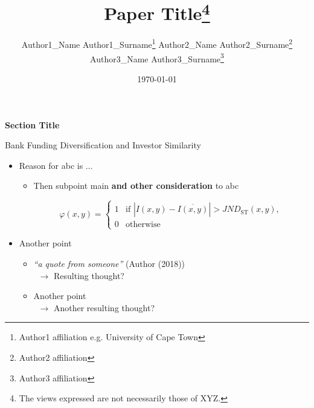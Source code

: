 \documentclass[xcolor=dvipsnames,10pt]{beamer}
\begin{document}
%

\author[Author1Surname/Author2Surname/Author3Surname]{Author1\_Name Author1\_Surname\thanks{Author1 affiliation e.g. University of Cape Town} \quad Author2\_Name Author2\_Surname\thanks{Author2 affiliation} \quad Author3\_Name Author3\_Surname\thanks{Author3 affiliation}}
\title[Paper Title]{Paper Title\footnote{The views expressed are not necessarily those of XYZ.}}
\date[Name of Conference, \today]{\today}

\begin{frame}
	\titlepage
\end{frame}

\begin{frame}
	\thispagestyle{empty}
	\begin{center}
		{\bf {\Large Section Title}}
	\end{center}
\end{frame}

\begin{frame}{Bank Funding Diversification and Investor Similarity}
	\setcounter{framenumber}{2}

	
	\begin{itemize}\itemsep15pt
		\item Reason for abc is $\ldots$
		\begin{itemize}\itemsep7pt
			\item Then subpoint main {\bf and other consideration} to abc
			
				\begin{equation}
				\varphi(x,y) =
				\begin{cases} 
					1 & \text{if $|I(x,y) - \overline{I(x,y)}|> \mathit{JND}_{\mathrm{ST}}(x,y)$}, \\
					0 & \text{otherwise}
				\end{cases}
			\end{equation}
		
		\end{itemize}\pause
		\item Another point
		\begin{itemize}\itemsep7pt
			\item {\em ``a quote from someone''} (Author (2018))\\
			~\hfill $\rightarrow$ Resulting thought?
			\item Another point\\
			~\hfill $\rightarrow$ Another resulting thought?
		\end{itemize}\pause
	\end{itemize}
\end{frame}
\end{document}
